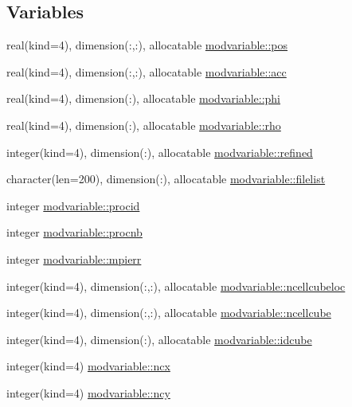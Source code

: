 \subsection*{Variables}
\begin{DoxyCompactItemize}
\item 
real(kind=4), dimension(\+:,\+:), allocatable \hyperlink{namespacemodvariable_a280e598b1db785bf34f0165ecd7b6985}{modvariable\+::pos}
\item 
real(kind=4), dimension(\+:,\+:), allocatable \hyperlink{namespacemodvariable_a3d403cfbb8c3f6373447b1e6647d7aa7}{modvariable\+::acc}
\item 
real(kind=4), dimension(\+:), allocatable \hyperlink{namespacemodvariable_a00db7c06432451702db34fda71ed1cd1}{modvariable\+::phi}
\item 
real(kind=4), dimension(\+:), allocatable \hyperlink{namespacemodvariable_a29eaedbfcc5873ff326af3c93e5558c6}{modvariable\+::rho}
\item 
integer(kind=4), dimension(\+:), allocatable \hyperlink{namespacemodvariable_a8de6519433943eabe03c631fdab15e67}{modvariable\+::refined}
\item 
character(len=200), dimension(\+:), allocatable \hyperlink{namespacemodvariable_a73053f430f8e14a8f6c91851e02ca4c0}{modvariable\+::filelist}
\item 
integer \hyperlink{namespacemodvariable_af640fc287249ccc7e43133f74d704cf5}{modvariable\+::procid}
\item 
integer \hyperlink{namespacemodvariable_a77ab6ce14a18f48d9c5f3ccd1f1cf044}{modvariable\+::procnb}
\item 
integer \hyperlink{namespacemodvariable_a85886f33027f4edc9331bd9ada689d22}{modvariable\+::mpierr}
\item 
integer(kind=4), dimension(\+:,\+:), allocatable \hyperlink{namespacemodvariable_ac90972e5c9f0aa13073f9f1f6f9cf879}{modvariable\+::ncellcubeloc}
\item 
integer(kind=4), dimension(\+:,\+:), allocatable \hyperlink{namespacemodvariable_a8bc6342027666b4dec0f7f417c754b55}{modvariable\+::ncellcube}
\item 
integer(kind=4), dimension(\+:), allocatable \hyperlink{namespacemodvariable_a3d2c992bfc80529f8019708135b526c1}{modvariable\+::idcube}
\item 
integer(kind=4) \hyperlink{namespacemodvariable_af74891a7a77b7407b68129d1e9778f21}{modvariable\+::ncx}
\item 
integer(kind=4) \hyperlink{namespacemodvariable_ac9a317ff189f6a3f0bac9df49e622027}{modvariable\+::ncy}

\end{DoxyCompactItemize}
